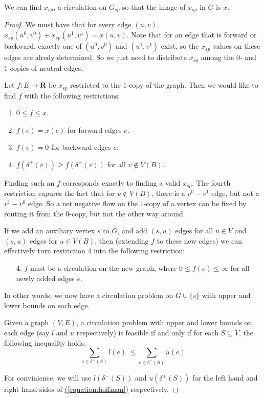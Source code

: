 \documentclass[./main.tex]{subfiles}
\begin{document}
			\begin{lemma}\label{lemma6-1}
				We can find $x_{sp}$, a circulation on $G_{sp}$ so that the image of $x_{sp}$ in $G$ is $x$.
			\end{lemma}
			\begin{proof}
			We must have that for every edge $(u,v)$, $x_{sp}(u^0,v^0) + x_{sp}(u^1,v^1) = x(u,v)$. Note that for an edge that is forward or backward, exactly one of $(u^0,v^0)$ and $(u^1,v^1)$ exist, so the $x_{sp}$ values on these edges are alredy determined. So we just need to distribute $x_{sp}$ among the $0$- and $1$-copies of neutral edges.

			Let $f:E\rightarrow \mathbf{R}$ be $x_{sp}$ restricted to the $1$-copy of the graph. Then we would like to find $f$ with the following restrictions:
			\begin{enumerate}
				\item $0\leq f\leq x$.
				\item $f(e) = x(e)$ for forward edges $e$.
				\item $f(e) = 0$ for backward edges $e$.
				\item $f(\delta^+(v))\geq f(\delta^-(v))$ for all $v\notin V(B)$.
			\end{enumerate}
			Finding such an $f$ corresponds exactly to finding a valid $x_{sp}$. The fourth restriction capures the fact that for $v\notin V(B)$, there is a $v^0-v^1$ edge, but not a $v^1-v^0$ edge. So a net negative flow on the $1$-copy of a vertex can be fixed by routing it from the $0$-copy, but not the other way around.

			If we add an auxiliary vertex $s$ to $G$, and add $(s,u)$ edges for all $u\in V$ and $(s,u)$ edges for $u\in V(B)$, then (extending $f$ to these new edges) we can effectively turn restriction $4$ into the following restriction:
			\begin{enumerate}
				\item[$4$.] $f$ must be a circulation on the new graph, where $0\leq f(e)\leq \infty$ for all newly added edges $e$.
			\end{enumerate}
			In other words, we now have a circulation problem on $G\cup \{s\}$ with upper and lower bounds on each edge.
			\begin{theorem}
			Given a graph $(V,E)$, a circulation problem with upper and lower bounds on each edge (say $l$ and $u$ respectively) is feasible if and only if for each $S\subseteq V$, the following inequality holds:\begin{equation} \sum_{e\in \delta^-(S)}l(e)\ \leq \sum_{e\in \delta^+(S)}u(e)\label{equation:hoffman}\end{equation}
			\end{theorem}
			For convinience, we will use $l(\delta^-(S))$ and $u(\delta^+(S))$ for the left hand and right hand sides of \hyperref[equation:hoffman]{(\ref{equation:hoffman})} respectively.


\end{proof}
\end{document}
